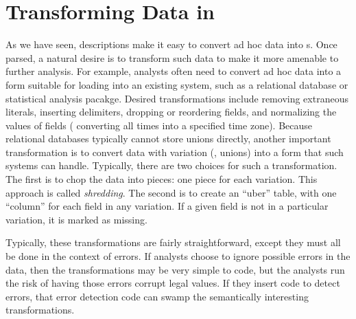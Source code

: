 \section{Transforming Data in \datatype{}}
\label{sec:data-transformation}


As we have seen, \datatype{} descriptions make it easy to convert ad hoc data into \pvalue{}s.  Once parsed, a natural desire is to transform such data
to make it more amenable to further analysis.  For example, analysts often need to convert ad hoc data into a form suitable for loading into an existing system, such as a relational database or statistical analysis pacakge.  Desired transformations include removing extraneous literals, inserting delimiters, dropping or reordering fields, and normalizing the values of fields (\eg{} converting all times into a specified time zone).  Because relational databases typically cannot store unions directly, another important transformation is to convert data with variation (\ie{}, unions) into a form that such systems can handle.  Typically, there are two choices for such a transformation.  The first is to chop the data into pieces: one piece for each variation.  This approach is called \textit{shredding}. The second is to create an ``uber'' table, with one ``column'' for each field in any variation.  
If a given field is not in a particular variation, it is marked as  missing.

Typically, these transformations are fairly straightforward, except they must all be done in the context of errors.  If analysts choose to ignore possible errors in the data, then the transformations may be very simple to code, but the analysts run the risk of having those errors corrupt legal values.  If they insert code to detect errors, that error detection code can swamp the semantically interesting transformations.

